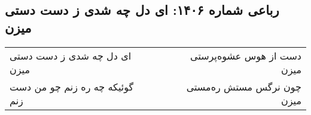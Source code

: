 \begin{center}
\section*{رباعی شماره ۱۴۰۶: ای دل چه شدی ز دست دستی میزن}
\label{sec:1406}
\begin{longtable}{l p{0.5cm} r}
ای دل چه شدی ز دست دستی میزن
&&
دست از هوس عشوه‌پرستی میزن
\\
گوئیکه چه ره زنم چو من دست زنم
&&
چون نرگس مستش ره‌مستی میزن
\\
\end{longtable}
\end{center}

